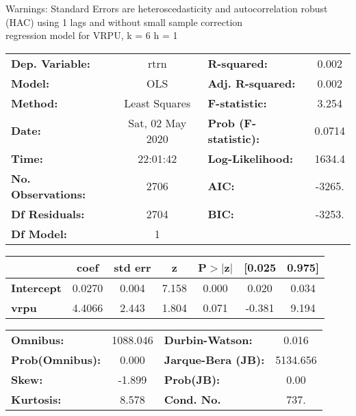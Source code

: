 Warnings: \newline
 [1] Standard Errors are heteroscedasticity and autocorrelation robust (HAC) using 1 lags and without small sample correction\\ 

regression model for VRPU, k = 6 h = 1\begin{center}
\begin{tabular}{lclc}
\toprule
\textbf{Dep. Variable:}    &       rtrn       & \textbf{  R-squared:         } &     0.002   \\
\textbf{Model:}            &       OLS        & \textbf{  Adj. R-squared:    } &     0.002   \\
\textbf{Method:}           &  Least Squares   & \textbf{  F-statistic:       } &     3.254   \\
\textbf{Date:}             & Sat, 02 May 2020 & \textbf{  Prob (F-statistic):} &   0.0714    \\
\textbf{Time:}             &     22:01:42     & \textbf{  Log-Likelihood:    } &    1634.4   \\
\textbf{No. Observations:} &        2706      & \textbf{  AIC:               } &    -3265.   \\
\textbf{Df Residuals:}     &        2704      & \textbf{  BIC:               } &    -3253.   \\
\textbf{Df Model:}         &           1      & \textbf{                     } &             \\
\bottomrule
\end{tabular}
\begin{tabular}{lcccccc}
                   & \textbf{coef} & \textbf{std err} & \textbf{z} & \textbf{P$> |$z$|$} & \textbf{[0.025} & \textbf{0.975]}  \\
\midrule
\textbf{Intercept} &       0.0270  &        0.004     &     7.158  &         0.000        &        0.020    &        0.034     \\
\textbf{vrpu}      &       4.4066  &        2.443     &     1.804  &         0.071        &       -0.381    &        9.194     \\
\bottomrule
\end{tabular}
\begin{tabular}{lclc}
\textbf{Omnibus:}       & 1088.046 & \textbf{  Durbin-Watson:     } &    0.016  \\
\textbf{Prob(Omnibus):} &   0.000  & \textbf{  Jarque-Bera (JB):  } & 5134.656  \\
\textbf{Skew:}          &  -1.899  & \textbf{  Prob(JB):          } &     0.00  \\
\textbf{Kurtosis:}      &   8.578  & \textbf{  Cond. No.          } &     737.  \\
\bottomrule
\end{tabular}
\end{center}

